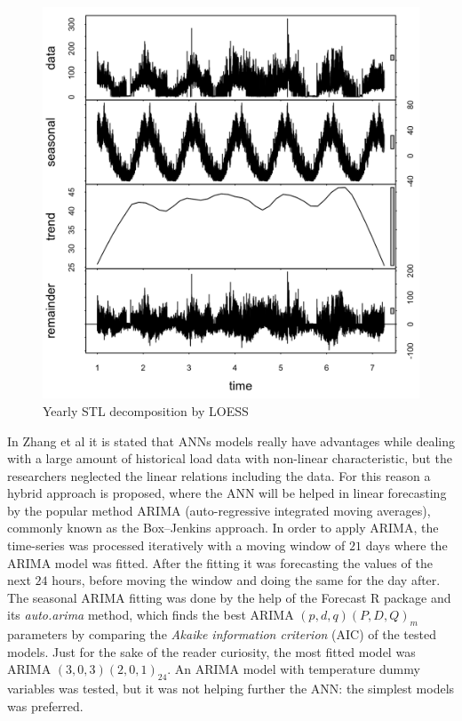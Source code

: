 \documentclass{sig-alternate-sigmod07}
\begin{document}
\begin{figure}
\centering
\includegraphics[width=\columnwidth]{STL.png}
\caption{Yearly STL decomposition by LOESS}
\label{fig:STL}
\end{figure}

In Zhang et al \cite{zhang1998forecasting} it is stated that ANNs models really have advantages while dealing with a large amount of historical load data with non-linear characteristic, but the researchers neglected the linear relations including the data. For this reason a hybrid approach is proposed, where the ANN will be helped in linear forecasting by the popular method ARIMA (auto-regressive integrated moving averages), commonly known as the Box–Jenkins approach. In order to apply ARIMA, the time-series was processed iteratively with a moving window of $21$ days where the ARIMA model was fitted. After the fitting it was forecasting the values of the next $24$ hours, before moving the window and doing the same for the day after. The seasonal ARIMA fitting was done by the help of the Forecast R package \cite{hyndman2007automatic} and its \emph{auto.arima} method, which finds the best ARIMA $(p,d,q) (P,D,Q)_m$ parameters by comparing the \emph{Akaike information criterion} (AIC) of the tested models. Just for the sake of the reader curiosity, the most fitted model was ARIMA $(3,0,3) (2,0,1)_{24}$. An ARIMA model with temperature dummy variables was tested, but it was not helping further the ANN: the simplest models was preferred.
\end{document}

